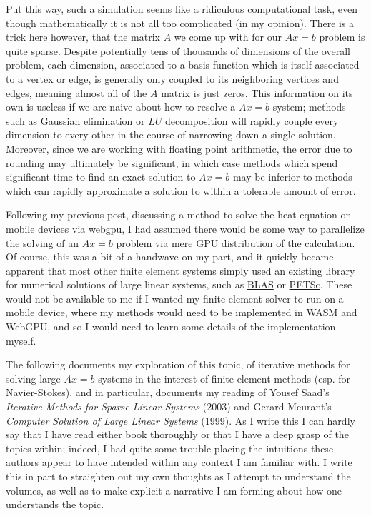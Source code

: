 \documentclass[11pt]{article}
\begin{document}
Put this way, such a simulation seems like a ridiculous computational task, even though mathematically it is not all too complicated (in my opinion). There is a trick here however, that the matrix $A$ we come up with for our $Ax=b$ problem is quite sparse. Despite potentially tens of thousands of dimensions of the overall problem, each dimension, associated to a basis function which is itself associated to a vertex or edge, is generally only coupled to its neighboring vertices and edges, meaning almost all of the $A$ matrix is just zeros. This information on its own is useless if we are naive about how to resolve a $Ax=b$ system; methods such as Gaussian elimination or $LU$ decomposition will rapidly couple every dimension to every other in the course of narrowing down a single solution. Moreover, since we are working with floating point arithmetic, the error due to rounding may ultimately be significant, in which case methods which spend significant time to find an exact solution to $Ax=b$ may be inferior to methods which can rapidly approximate a solution to within a tolerable amount of error.

Following my previous post, discussing a method to solve the heat equation on mobile devices via webgpu, I had assumed there would be some way to parallelize the solving of an $Ax=b$ problem via mere GPU distribution of the calculation. Of course, this was a bit of a handwave on my part, and it quickly became apparent that most other finite element systems simply used an existing library for numerical solutions of large linear systems, such as \hyperlink{https://en.wikipedia.org/wiki/Basic_Linear_Algebra_Subprograms}{BLAS} or \hyperlink{https://en.wikipedia.org/wiki/Portable,_Extensible_Toolkit_for_Scientific_Computation}{PETSc}. These would not be available to me if I wanted my finite element solver to run on a mobile device, where my methods would need to be implemented in WASM and WebGPU, and so I would need to learn some details of the implementation myself.

The following documents my exploration of this topic, of iterative methods for solving large $Ax=b$ systems in the interest of finite element methods (esp. for Navier-Stokes), and in particular, documents my reading of Yousef Saad's \emph{Iterative Methods for Sparse Linear Systems} (2003) and Gerard Meurant's \emph{Computer Solution of Large Linear Systems} (1999). As I write this I can hardly say that I have read either book thoroughly or that I have a deep grasp of the topics within; indeed, I had quite some trouble placing the intuitions these authors appear to have intended within any context I am familiar with. I write this in part to straighten out my own thoughts as I attempt to understand the volumes, as well as to make explicit a narrative I am forming about how one understands the topic.
\end{document}
